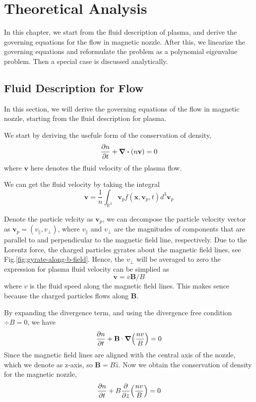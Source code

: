 \chapter{Theoretical Analysis} \label{chap:theoretical-analysis}

In this chapter, we start from the fluid description of plasma, and derive the governing equations for the flow in magnetic nozzle. After this, we linearize the governing equations and reformulate the problem as a polynomial eigenvalue problem. Then a special case is discussed analytically.

\section{Fluid Description for Flow}
In this section, we will derive the governing equations of the flow in magnetic nozzle, starting from the fluid description for plasma.

We start by deriving the usefule form of the conservation of density,
\[ \pdv{n}{t} + \div(n\mathbf{v}) = 0 \]
where $\mathbf{v}$ here denotes the fluid velocity of the plasma flow.

We can get the fluid velocity by taking the integral
\[ \mathbf{v} = \frac{1}{n}\int_{\mathbb{R}^3} \mathbf{v}_p f(\mathbf{x}, \mathbf{v}_p, t) d^3\mathbf{v}_p \]

Denote the particle velcity as $\mathbf{v}_p$, we can decompose the particle velocity vector as $\mathbf{v}_p = (v_\parallel,v_\perp)$, where $v_\parallel$ and $v_\perp$ are the magnitudes of components that are parallel to and perpendicular to the magnetic field line, respectively. Due to the Lorentz force, the charged particles gyrates about the magnetic field lines, see Fig.\ref{fig:gyrate-along-b-field}. Hence, the $v_\perp$ will be averaged to zero the expression for plasma fluid velocity can be simplied as
\[\mathbf{v} = v\mathbf{B}/B\]
where $v$ is the fluid speed along the magnetic field lines. This makes sence because the charged particles flows along $\mathbf{B}$.

By expanding the divergence term, and using the divergence free condition $\div B=0$, we have
\[ \pdv{n}{t} + \mathbf{B}\cdot \grad(\frac{nv}{B}) = 0 \]
Since the magnetic field lines are aligned with the central axis of the nozzle, which we denote as z-axis, so $\mathbf{B} = B\hat{z}$. Now we obtain the conservation of density for the magnetic nozzle,
\begin{equation}
	\pdv{n}{t} + B\pdv{z}(\frac{nv}{B}) = 0
\end{equation}

